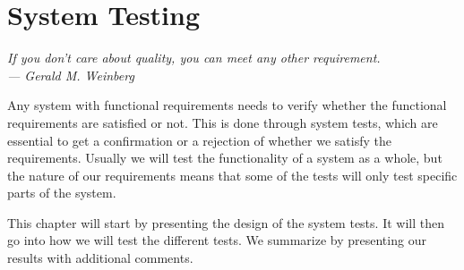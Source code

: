 \chapter{System Testing}\label{ch:sys-test}

\begin{flushright}{\slshape
    If you don’t care about quality, you can meet any other requirement.\\ \medskip
    --- Gerald M. Weinberg}
\end{flushright}

Any system with functional requirements needs to verify whether the functional
requirements are satisfied or not. This is done through system tests, which are
essential to get a confirmation or a rejection of whether we satisfy the
requirements. Usually we will test the functionality of a system as a whole, but
the nature of our requirements means that some of the tests will only test
specific parts of the system.

This chapter will start by presenting the design of the system tests. It will
then go into how we will test the different tests. We summarize by presenting
our results with additional comments.




